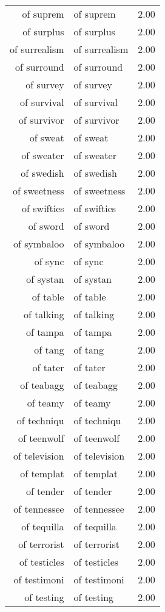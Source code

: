 \begin{table}[ht]
\begin{tabular}{rlr}
  of suprem & of suprem & 2.00 \\ 
  of surplus & of surplus & 2.00 \\ 
  of surrealism & of surrealism & 2.00 \\ 
  of surround & of surround & 2.00 \\ 
  of survey & of survey & 2.00 \\ 
  of survival & of survival & 2.00 \\ 
  of survivor & of survivor & 2.00 \\ 
  of sweat & of sweat & 2.00 \\ 
  of sweater & of sweater & 2.00 \\ 
  of swedish & of swedish & 2.00 \\ 
  of sweetness & of sweetness & 2.00 \\ 
  of swifties & of swifties & 2.00 \\ 
  of sword & of sword & 2.00 \\ 
  of symbaloo & of symbaloo & 2.00 \\ 
  of sync & of sync & 2.00 \\ 
  of systan & of systan & 2.00 \\ 
  of table & of table & 2.00 \\ 
  of talking & of talking & 2.00 \\ 
  of tampa & of tampa & 2.00 \\ 
  of tang & of tang & 2.00 \\ 
  of tater & of tater & 2.00 \\ 
  of teabagg & of teabagg & 2.00 \\ 
  of teamy & of teamy & 2.00 \\ 
  of techniqu & of techniqu & 2.00 \\ 
  of teenwolf & of teenwolf & 2.00 \\ 
  of television & of television & 2.00 \\ 
  of templat & of templat & 2.00 \\ 
  of tender & of tender & 2.00 \\ 
  of tennessee & of tennessee & 2.00 \\ 
  of tequilla & of tequilla & 2.00 \\ 
  of terrorist & of terrorist & 2.00 \\ 
  of testicles & of testicles & 2.00 \\ 
  of testimoni & of testimoni & 2.00 \\ 
  of testing & of testing & 2.00 \\ 

\end{tabular}
\end{table}
